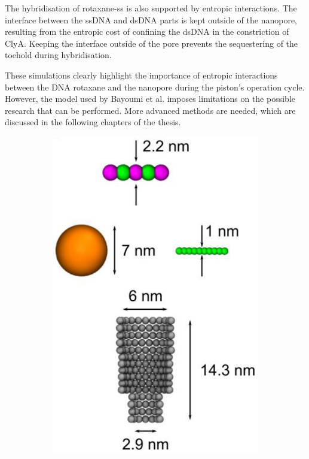 The hybridisation of rotaxane-ss is also supported by entropic interactions. The
interface between the ssDNA and dsDNA parts is kept outside of the nanopore, resulting
from the entropic cost of confining the dsDNA in the constriction of ClyA. Keeping the
interface outside of the pore prevents the sequestering of the toehold during
hybridisation.

These simulations clearly highlight the importance of entropic interactions between the
DNA rotaxane and the nanopore during the piston's operation cycle. However, the model
used by Bayoumi et al.\cite{Bayoumi21} imposes limitations on the possible research that
can be
performed. More advanced methods are needed, which are discussed in the following
chapters of the thesis.\\

\begin{figure}[ht]
  \begin{centering}
  \begin{subfigure}[t]{\dimexpr.35\linewidth-1.3em\relax}
  \centering
  \includegraphics[width=0.9\linewidth,valign=t]{Figures/Stefanos1.png}

\end{subfigure}
\end{centering}
\end{figure}
